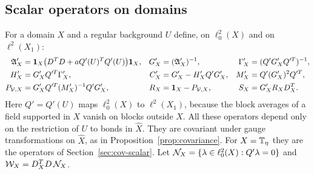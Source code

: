 \subsection{Scalar operators on domains}\label{ss:18.2}

For a domain $X$ and a regular background $U$ define, on $\ell^2_0(X)$ and on $\ell^2(X_1)$:
\begin{align*}
\mathfrak A'_X&=\mathbf 1_X\big(D^TD+aQ'(U)^TQ'(U)\big)\mathbf 1_X, & G'_X&=(\mathfrak A'_X)^{-1}, & \Gamma'_X&=(Q'G'_XQ'^T)^{-1},\\
H'_X&=G'_XQ'^T\Gamma'_X, & C'_X&=G'_X-H'_XQ'G'_X, & M'_X&=Q'(G'_X)^2Q'^T,\\
P_{\mathcal V,X}&=G'_XQ'^T(M'_X)^{-1}Q'G'_X, & R_X&=\mathbf 1_X-P_{\mathcal V,X}, & S_X&=G'_XR_XD^T_X .
\end{align*}
Here $Q'=Q'(U)$ maps $\ell^2_0(X)$ to $\ell^2(X_1)$, because the block averages of a field supported in $X$ vanish on blocks outside $X$. All these operators depend only on the restriction of $U$ to bonds in $\hat X$. They are covariant under gauge transformations on $\hat X$, as in Proposition~\ref{prop:covariance}. For $X=\mathbb T_\eta$ they are the operators of Section~\ref{sec:cov-scalar}. Let $\mathcal N_X=\{\lambda\in\ell^2_0(X):Q'\lambda=0\}$ and $\mathcal W_X=D^T_XD\,\mathcal N_X$.

